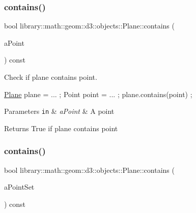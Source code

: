 \subsubsection{\texorpdfstring{contains()}{contains()}\hspace{0.1cm}{\footnotesize\ttfamily [1/5]}}
{\footnotesize\ttfamily bool library\+::math\+::geom\+::d3\+::objects\+::\+Plane\+::contains (\begin{DoxyParamCaption}\item[{const \hyperlink{classlibrary_1_1math_1_1geom_1_1d3_1_1objects_1_1_point}{Point} \&}]{a\+Point }\end{DoxyParamCaption}) const}



Check if plane contains point. 


\begin{DoxyCode}
\hyperlink{classlibrary_1_1math_1_1geom_1_1d3_1_1objects_1_1_plane_a81fe78a983e2cb6ee6ad9bfabd22c3a4}{Plane} plane = ... ;
Point point = ... ;
plane.contains(point) ;
\end{DoxyCode}



\begin{DoxyParams}[1]{Parameters}
\mbox{\tt in}  & {\em a\+Point} & A point \\
\hline
\end{DoxyParams}
\begin{DoxyReturn}{Returns}
True if plane contains point 
\end{DoxyReturn}
\mbox{\label{classlibrary_1_1math_1_1geom_1_1d3_1_1objects_1_1_plane_ab3dda718ba2d7f5e88c684fc32f0c741}} 
\subsubsection{\texorpdfstring{contains()}{contains()}\hspace{0.1cm}{\footnotesize\ttfamily [2/5]}}
{\footnotesize\ttfamily bool library\+::math\+::geom\+::d3\+::objects\+::\+Plane\+::contains (\begin{DoxyParamCaption}\item[{const \hyperlink{classlibrary_1_1math_1_1geom_1_1d3_1_1objects_1_1_point_set}{Point\+Set} \&}]{a\+Point\+Set }\end{DoxyParamCaption}) const}



